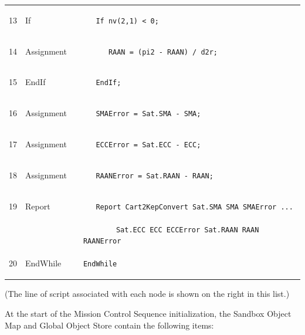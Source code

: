 \begin{center}
\begin{supertabular}{lllp{4in}}
\begin{footnotesize}13\end{footnotesize} & If & & \texttt{\ \ \ If nv(2,1) < 0;}\\
\begin{footnotesize}14\end{footnotesize} & Assignment & & \texttt{\ \ \ \ \ \ RAAN = (pi2 - RAAN)
/ d2r;}\\
\begin{footnotesize}15\end{footnotesize} & EndIf & & \texttt{\ \ \ EndIf;}\\
\begin{footnotesize}16\end{footnotesize} & Assignment & & \texttt{\ \ \ SMAError  = Sat.SMA -
SMA;}\\
\begin{footnotesize}17\end{footnotesize} & Assignment & & \texttt{\ \ \ ECCError  = Sat.ECC -
ECC;}\\
\begin{footnotesize}18\end{footnotesize} & Assignment & & \texttt{\ \ \ RAANError = Sat.RAAN -
RAAN;}\\
\begin{footnotesize}19\end{footnotesize} & Report & & \texttt{\ \ \ Report Cart2KepConvert Sat.SMA
SMA SMAError ...}\\
& & & \ \ \ \ \ \ \ \ \texttt{Sat.ECC ECC ECCError Sat.RAAN RAAN RAANError}\\
\begin{footnotesize}20\end{footnotesize} & EndWhile & & \texttt{EndWhile}\\
\end{supertabular}
\end{center}

\noindent (The line of script associated with each node is shown on the right in this list.)

At the start of the Mission Control Sequence initialization, the Sandbox Object Map and Global
Object Store contain the following items:

\pagebreak 

